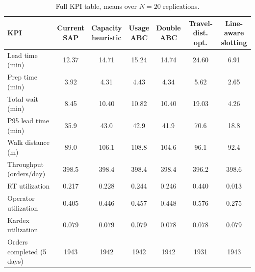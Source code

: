 \documentclass[12pt,a4paper]{article}
\begin{document}
\begin{table}[htbp]
\centering
\caption{Full KPI table, means over $N=20$ replications.}
\label{tab:kpifull}
\scriptsize
\setlength{\tabcolsep}{3pt}
\begin{tabular}{l*{6}{c}}
\toprule
KPI & \makecell{Current\\SAP} & \makecell{Capacity\\heuristic} & \makecell{Usage\\ABC} & \makecell{Double\\ABC} & \makecell{Travel-dist.\\opt.} & \makecell{Line-aware\\slotting} \\
\midrule
Lead time (min) & 12.37 & 14.71 & 15.24 & 14.74 & 24.60 & 6.91 \\
Prep time (min) & 3.92 & 4.31 & 4.43 & 4.34 & 5.62 & 2.65 \\
Total wait (min) & 8.45 & 10.40 & 10.82 & 10.40 & 19.03 & 4.26 \\
P95 lead time (min) & 35.9 & 43.0 & 42.9 & 41.9 & 70.6 & 18.8 \\
Walk distance (m) & 89.0 & 106.1 & 108.8 & 104.6 & 96.1 & 92.4 \\
Throughput (orders/day) & 398.5 & 398.4 & 398.4 & 398.4 & 396.2 & 398.6 \\
RT utilization & 0.217 & 0.228 & 0.244 & 0.246 & 0.440 & 0.013 \\
Operator utilization & 0.405 & 0.446 & 0.457 & 0.448 & 0.576 & 0.275 \\
Kardex utilization & 0.079 & 0.079 & 0.079 & 0.078 & 0.078 & 0.079 \\
Orders completed (5 days) & 1943 & 1942 & 1942 & 1942 & 1931 & 1943 \\
\bottomrule
\end{tabular}
\end{table}
\end{document}
